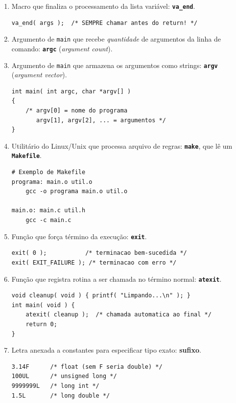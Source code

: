 \documentclass[12pt,a4paper]{article}
\begin{document}
\begin{respostabox}
\begin{enumerate}[label=\textbf{\alph*)}]
\item Macro que finaliza o processamento da lista variável:
\textbf{\texttt{va\_end}}.
\begin{lstlisting}
va_end( args );  /* SEMPRE chamar antes do return! */
\end{lstlisting}

\item Argumento de \texttt{main} que recebe \textit{quantidade} de argumentos
da linha de comando: \textbf{\texttt{argc}} (\textit{argument count}).

\item Argumento de \texttt{main} que armazena os argumentos como strings:
\textbf{\texttt{argv}} (\textit{argument vector}).
\begin{lstlisting}
int main( int argc, char *argv[] )
{
    /* argv[0] = nome do programa
       argv[1], argv[2], ... = argumentos */
}
\end{lstlisting}

\item Utilitário do Linux/Unix que processa arquivo de regras:
\textbf{\texttt{make}}, que lê um \textbf{\texttt{Makefile}}.
\begin{lstlisting}
# Exemplo de Makefile
programa: main.o util.o
    gcc -o programa main.o util.o

main.o: main.c util.h
    gcc -c main.c
\end{lstlisting}

\item Função que força término da execução: \textbf{\texttt{exit}}.
\begin{lstlisting}
exit( 0 );           /* terminacao bem-sucedida */
exit( EXIT_FAILURE ); /* terminacao com erro */
\end{lstlisting}

\item Função que registra rotina a ser chamada no término normal:
\textbf{\texttt{atexit}}.
\begin{lstlisting}
void cleanup( void ) { printf( "Limpando...\n" ); }
int main( void ) {
    atexit( cleanup );  /* chamada automatica ao final */
    return 0;
}
\end{lstlisting}

\item Letra anexada a constantes para especificar tipo exato:
\textbf{sufixo}.
\begin{lstlisting}
3.14F      /* float (sem F seria double) */
100UL      /* unsigned long */
9999999L   /* long int */
1.5L       /* long double */
\end{lstlisting}


\end{enumerate}
\end{respostabox}
\end{document}
